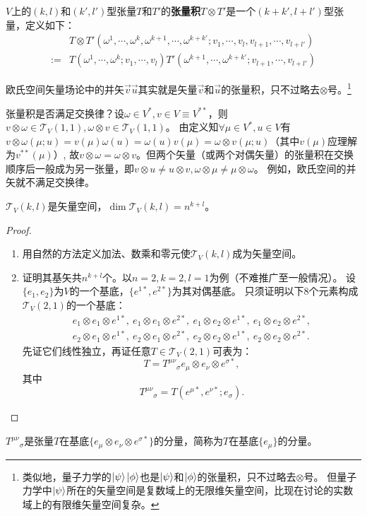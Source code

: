 \begin{definition}
$V$上的$(k, l)$和$(k', l')$型张量$T$和$T'$的\textbf{张量积}$T \otimes T'$是一个$(k + k', l + l')$型张量，定义如下：
$$\begin{aligned}
& T \otimes T'(\omega^1, \cdots, \omega^k, \omega^{k + 1}, \cdots, \omega^{k + k'}; v_1, \cdots, v_l, v_{l + 1}, \cdots, v_{l + l'}) \\
:= & T(\omega^1, \cdots, \omega^k; v_1, \cdots, v_l)T'(\omega^{k + 1}, \cdots, \omega^{k + k'}; v_{l + 1}, \cdots, v_{l + l'})
\end{aligned}$$
\end{definition}

欧氏空间矢量场论中的并矢$\vec{v}\vec{u}$其实就是矢量$\vec{v}$和$\vec{u}$的张量积，只不过略去$\otimes$号。\footnote{
类似地，量子力学的$\ket{\psi}\ket{\phi}$也是$\ket{\psi}$和$\ket{\phi}$的张量积，只不过略去$\otimes$号。
但量子力学中$\ket{\psi}$所在的矢量空间是复数域上的无限维矢量空间，比现在讨论的实数域上的有限维矢量空间复杂。
}

张量积是否满足交换律？设$\omega \in V^*, v \in V \equiv V^{**}$，则$v \otimes \omega \in \mathscr{T}_V(1, 1), \omega \otimes v \in \mathscr{T}_V(1, 1)$。
由定义知$\forall \mu \in V^*, u \in V$有$v \otimes \omega(\mu; u) = v(\mu)\omega(u) = \omega(u)v(\mu) = \omega \otimes v(\mu; u)$（其中$v(\mu)$应理解为$v^{**}(\mu)$）,
故$v \otimes \omega = \omega \otimes v$。但两个矢量（或两个对偶矢量）的张量积在交换顺序后一般成为另一张量，即$v \otimes u \neq u \otimes v, \omega \otimes \mu \neq \mu \otimes \omega$。
例如，欧氏空间的并矢就不满足交换律。

\begin{theorem}
$\mathscr{T}_V(k, l)$是矢量空间，$\dim\mathscr{T}_V(k, l) = n^{k + l}$。
\end{theorem}

\begin{proof}
\begin{enumerate}[（A）]
\item 用自然的方法定义加法、数乘和零元使$\mathscr{T}_V(k, l)$成为矢量空间。
\item 证明其基矢共$n^{k + l}$个。以$n = 2, k = 2, l = 1$为例（不难推广至一般情况）。
设$\{e_1, e_2\}$为$V$的一个基底，$\{e^{1*}, e^{2*}\}$为其对偶基底。
只须证明以下$8$个元素构成$\mathscr{T}_V(2, 1)$的一个基底：
$$\begin{aligned}
e_1 \otimes e_1 \otimes e^{1*}, ~ e_1 \otimes e_1 \otimes e^{2*}, ~ e_1 \otimes e_2 \otimes e^{1*}, ~ e_1 \otimes e_2 \otimes e^{2*}, \\
e_2 \otimes e_1 \otimes e^{1*}, ~ e_2 \otimes e_1 \otimes e^{2*}, ~ e_2 \otimes e_2 \otimes e^{1*}, ~ e_2 \otimes e_2 \otimes e^{2*}.
\end{aligned}$$
先证它们线性独立，再证任意$T \in \mathscr{T}_V(2, 1)$可表为：
$$T = T^{\mu\nu}{}_\sigma e_\mu \otimes e_\nu \otimes e^{\sigma*},$$
其中
$$T^{\mu\nu}{}_\sigma = T(e^{\mu*}, e^{\nu*}; e_\sigma).$$
\end{enumerate}
\end{proof}

\begin{note}
$T^{\mu\nu}{}_\sigma$是张量$T$在基底$\{e_\mu \otimes e_\nu \otimes e^{\sigma*}\}$的分量，简称为$T$在基底$\{e_\mu\}$的分量。
\end{note}
